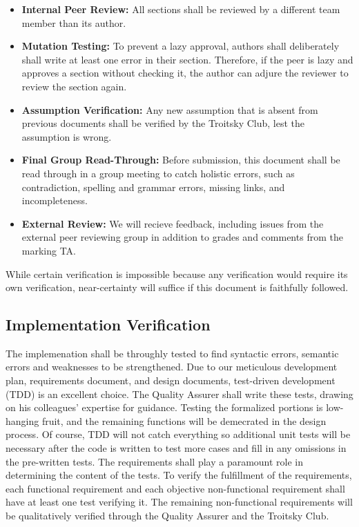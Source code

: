 \documentclass[12pt, titlepage]{article}
\begin{document}
\begin{itemize}
  \item \textbf{Internal Peer Review:} All sections shall be reviewed by a different team member than its author.
  \item \textbf{Mutation Testing:} To prevent a lazy approval, authors shall deliberately shall write at least one error in their section. Therefore, if the peer is lazy and approves a section without checking it, the author can adjure the reviewer to review the section again.
  \item \textbf{Assumption Verification:} Any new assumption that is absent from previous documents shall be verified by the Troitsky Club, lest the assumption is wrong.
  \item \textbf{Final Group Read-Through:} Before submission, this document shall be read through in a group meeting to catch holistic errors, such as contradiction, spelling and grammar errors, missing links, and incompleteness.
  \item \textbf{External Review:} We will recieve feedback, including issues from the external peer reviewing group in addition to grades and comments from the marking TA.
\end{itemize}

While certain verification is impossible because any verification would require its own verification,
near-certainty will suffice if this document is faithfully followed.

\subsection{Implementation Verification}



The implemenation shall be throughly tested to find syntactic errors, semantic errors and weaknesses to be strengthened.
Due to our meticulous development plan, requirements document, and design documents, test-driven development (TDD) is an excellent choice.
The Quality Assurer shall write these tests, drawing on his colleagues' expertise for guidance. Testing the formalized portions is low-hanging fruit,
and the remaining functions will be demecrated in the design process. Of course, TDD will not catch everything so additional unit tests will be necessary
after the code is written to test more cases and fill in any omissions in the pre-written tests. The requirements shall play a paramount role in determining the
content of the tests. To verify the fulfillment of the requirements, each functional requirement and each objective non-functional requirement
shall have at least one test verifying it. The remaining non-functional requirements will be qualitatively verified through the Quality Assurer and the Troitsky Club.\\
\end{document}
